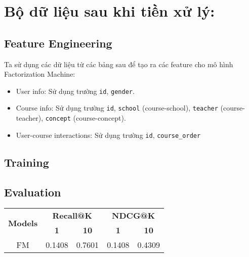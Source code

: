 \section{Bộ dữ liệu sau khi tiền xử lý:}
\subsection{Feature Engineering}
Ta sử dụng các dữ liệu từ các bảng sau để tạo ra các feature cho mô hình Factorization Machine:
\begin{itemize}
    \item User info: Sử dụng trường \texttt{id}, \texttt{gender}.
    \item Course info: Sử dụng trường \texttt{id}, \texttt{school} (course-school), \texttt{teacher} (course-teacher), \texttt{concept} (course-concept).
    \item User-course interactions: Sử dụng trường \texttt{id}, \texttt{course\_order}
\end{itemize}
\subsection{Training}

\subsection{Evaluation}
\begin{table}[h]
    \begin{center}
    \begin{tabular}{| c | c | c | c | c |}
    \hline
    \multirow{2}{*}{
        \centering
        \textbf{Models}
        } & \multicolumn{2}{c|}{\textbf{Recall@K}} & \multicolumn{2}{c|}{\textbf{NDCG@K}} \\ 
    \cline{2-5}
    & \textbf{1} & \textbf{10} & \textbf{1} & \textbf{10} \\
    \hline
    
    FM & 0.1408 & 0.7601 & 0.1408 & 0.4309 \\ \hline
    
    \end{tabular}
    \end{center}
    \end{table}